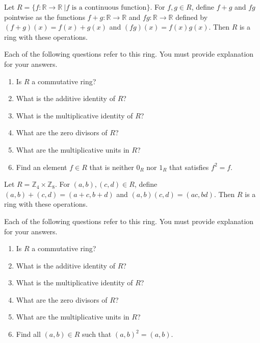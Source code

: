 
\newcommand{\C}{\mathbb{C}}
\newcommand{\R}{\mathbb{R}}
\newcommand{\Z}{\mathbb{Z}}
\newcommand{\lcm}{\operatorname{lcm}}


Let $R=\{f:\R\to\R\ | f\text{ is a continuous function}\}$. For $f,g\in R$, define $f+g$ and $fg$ pointwise as the functions $f+g:\R\to \R$ and $fg:\R\to\R$ defined by $(f+g)(x)=f(x)+g(x)$ and $(fg)(x)=f(x)g(x)$. Then $R$ is a ring with these operations.  

Each of the following questions refer to this ring. You must provide explanation for your answers.
\begin{enumerate}[label=(\alph*)]
	\item Is $R$ a commutative ring?\vfill
	\item What is the additive identity of $R$?\vfill
	\item What is the multiplicative identity of $R$?\vfill
	\item What are the zero divisors of $R$?  \vfill
	\item What are the multiplicative units in $R$?\vfill
	\item Find an element $f\in R$ that is neither $0_R$ nor $1_R$ that satisfies $f^2=f$.\vfill
\end{enumerate}
	

Let $R=\Z_4\times \Z_8$. For $(a,b),(c,d)\in R$, define $(a,b)+(c,d)=(a+c,b+d)$ and $(a,b)(c,d)=(ac,bd)$. Then $R$ is a ring with these operations.  

Each of the following questions refer to this ring. You must provide explanation for your answers.
\begin{enumerate}[label=(\alph*)]
	\item Is $R$ a commutative ring?\vfill
	\item What is the additive identity of $R$?\vfill
	\item What is the multiplicative identity of $R$?\vfill
	\item What are the zero divisors of $R$?  \vfill
	\item What are the multiplicative units in $R$?\vfill
	\item Find all $(a,b)\in R$ such that $(a,b)^2=(a,b)$.\vfill
\end{enumerate}